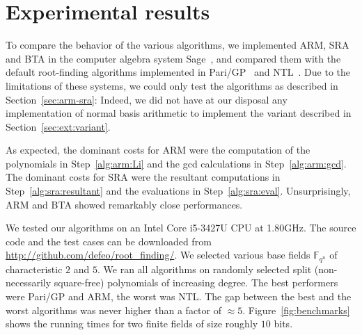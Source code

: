 \documentclass{sig-alternate}
\newcommand{\ff}[1]{\mathbb{F}_{#1}}
\newcommand{\qq}{q}
\newcommand{\nn}{n}
\newcommand{\qn}{{\qq^\nn}}
\newcommand{\extf}{\ff{\qn}}
\newcounter{algo}
\begin{document}
  





















\section{Experimental results}

To compare the behavior of the various algorithms, we implemented ARM,
SRA and BTA in the computer algebra system Sage~\cite{Sage}, and
compared them with the default root-finding algorithms implemented in
Pari/GP~\cite{Pari} and NTL~\cite{ntl}. Due to the limitations of
these systems, we could only test the algorithms as described in
Section~\ref{sec:arm-sra}: Indeed, we did not have at our disposal any
implementation of normal basis arithmetic to implement the variant
described in Section~\ref{sec:ext:variant}.

As expected, the dominant costs for ARM were the computation of the
polynomials in Step~\ref{alg:arm:Li} and the gcd calculations in
Step~\ref{alg:arm:gcd}. The dominant costs for SRA were the resultant
computations in Step~\ref{alg:sra:resultant} and the evaluations in
Step~\ref{alg:sra:eval}. Unsurprisingly, ARM and BTA showed remarkably
close performances.

We tested our algorithms on an Intel Core i5-3427U CPU at 1.80GHz. The
source code and the test cases can be downloaded from
\url{http://github.com/defeo/root_finding/}. We selected various base
fields $\extf$ of characteristic $2$ and $5$. We ran all algorithms on
randomly selected split (non-necessarily square-free) polynomials of
increasing degree. The best performers were Pari/GP and ARM, the worst
was NTL. The gap between the best and the worst algorithms was never
higher than a factor of $\approx 5$. Figure~\ref{fig:benchmarks} shows
the running times for two finite fields of size roughly $10$ bits.
\end{document}
